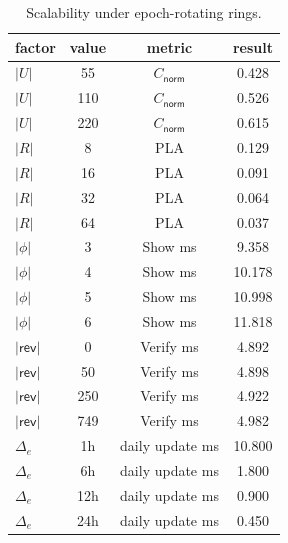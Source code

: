 \begin{table}[htbp]
\centering
\caption{Scalability under epoch-rotating rings.}
\label{tab:scalability}
\begin{tabular}{@{}lccc@{}}
\toprule
factor & value & metric & result \\
\midrule
$|U|$ & 55 & $C_{\mathsf{norm}}$ & 0.428 \\
$|U|$ & 110 & $C_{\mathsf{norm}}$ & 0.526 \\
$|U|$ & 220 & $C_{\mathsf{norm}}$ & 0.615 \\
$|R|$ & 8 & PLA & 0.129 \\
$|R|$ & 16 & PLA & 0.091 \\
$|R|$ & 32 & PLA & 0.064 \\
$|R|$ & 64 & PLA & 0.037 \\
$|\phi|$ & 3 & Show ms & 9.358 \\
$|\phi|$ & 4 & Show ms & 10.178 \\
$|\phi|$ & 5 & Show ms & 10.998 \\
$|\phi|$ & 6 & Show ms & 11.818 \\
$|\mathsf{rev}|$ & 0 & Verify ms & 4.892 \\
$|\mathsf{rev}|$ & 50 & Verify ms & 4.898 \\
$|\mathsf{rev}|$ & 250 & Verify ms & 4.922 \\
$|\mathsf{rev}|$ & 749 & Verify ms & 4.982 \\
$\Delta_e$ & 1h & daily update ms & 10.800 \\
$\Delta_e$ & 6h & daily update ms & 1.800 \\
$\Delta_e$ & 12h & daily update ms & 0.900 \\
$\Delta_e$ & 24h & daily update ms & 0.450 \\
\bottomrule
\end{tabular}
\end{table}
